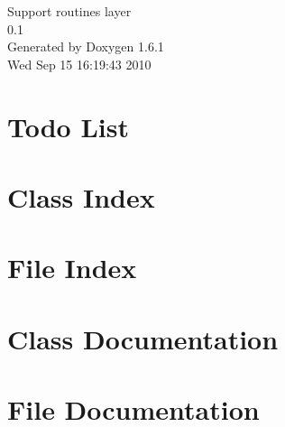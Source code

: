 \documentclass[a4paper]{book}
\begin{document}
\begin{titlepage}
\vspace*{7cm}
\begin{center}
{\Large Support routines layer \\[1ex]\large 0.1 }\\
\vspace*{1cm}
{\large Generated by Doxygen 1.6.1}\\
\vspace*{0.5cm}
{\small Wed Sep 15 16:19:43 2010}\\
\end{center}
\end{titlepage}
\clearemptydoublepage
{}
\tableofcontents
\clearemptydoublepage
{}
\chapter{Todo List}
\label{todo}

\chapter{Class Index}

\chapter{File Index}

\chapter{Class Documentation}

\chapter{File Documentation}


















\printindex
\end{document}
